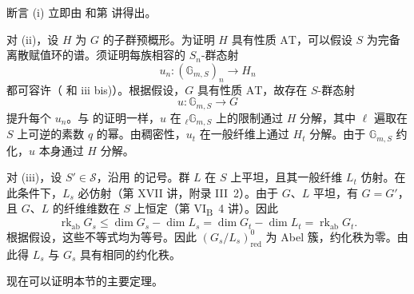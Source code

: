 断言 \textup{(i)} 立即由 和第  讲得出。

对 \textup{(ii)}，设 \(H\) 为 \(G\) 的子群预概形。为证明 \(H\) 具有性质 \(\mathrm{AT}\)，可以假设 \(S\) 为完备离散赋值环的谱。须证明每族相容的 \(S_n\)-群态射
\[
  u_n:(\mathbb G_{m,S})_n\longrightarrow H_n
\]
都可容许（ 和  \textup{iii bis)}）。根据假设，\(G\) 具有性质 \(\mathrm{AT}\)，故存在 \(S\)-群态射
\[
  u:\mathbb G_{m,S}\longrightarrow G
\]
提升每个 \(u_n\)。与 的证明一样，\(u\) 在 \({}_\ell\mathbb G_{m,S}\) 上的限制通过 \(H\) 分解，其中 \(\ell\) 遍取在 \(S\) 上可逆的素数 \(q\) 的幂。由稠密性，\(u_t\) 在一般纤维上通过 \(H_t\) 分解。由于 \(\mathbb G_{m,S}\) 约化，\(u\) 本身通过 \(H\) 分解。

对 \textup{(iii)}，设 \(S'\in\mathcal S\)，沿用 的记号。群 \(L\) 在 \(S\) 上平坦，且其一般纤维 \(L_t\) 仿射。在此条件下，\(L_s\) 必仿射（第 XVII 讲，附录 III~2）。由于 \(G\)、\(L\) 平坦，有 \(G=G'\)，且 \(G\)、\(L\) 的纤维维数在 \(S\) 上恒定（第 VI\textsubscript{B}~4 讲）。因此
\[
 \operatorname{rk}_{\mathrm{ab}}G_s
 \leq \dim G_s-\dim L_s
 =\dim G_t-\dim L_t
 =\operatorname{rk}_{\mathrm{ab}}G_t.
\]
根据假设，这些不等式均为等号。因此 \((G_s/L_s)^0_{\mathrm{red}}\) 为 Abel 簇，约化秩为零。由此得 \(L_s\) 与 \(G_s\) 具有相同的约化秩。

现在可以证明本节的主要定理。


